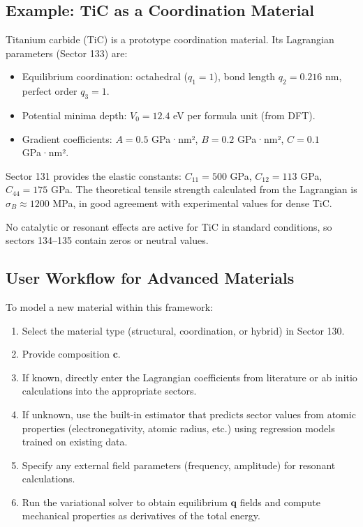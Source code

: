\documentclass[12pt,a4paper]{article}
\begin{document}
	\subsection{Example: TiC as a Coordination Material}
	\label{subsec:example-tic}
	
	Titanium carbide (TiC) is a prototype coordination material. Its Lagrangian parameters (Sector 133) are:
	
	\begin{itemize}
		\item Equilibrium coordination: octahedral (\(q_1=1\)), bond length \(q_2 = 0.216\) nm, perfect order \(q_3=1\).
		\item Potential minima depth: \(V_0 = 12.4\) eV per formula unit (from DFT).
		\item Gradient coefficients: \(A=0.5\) GPa·nm², \(B=0.2\) GPa·nm², \(C=0.1\) GPa·nm².
	\end{itemize}
	
	Sector 131 provides the elastic constants: \(C_{11}=500\) GPa, \(C_{12}=113\) GPa, \(C_{44}=175\) GPa. The theoretical tensile strength calculated from the Lagrangian is \(\sigma_B \approx 1200\) MPa, in good agreement with experimental values for dense TiC.
	
	No catalytic or resonant effects are active for TiC in standard conditions, so sectors 134–135 contain zeros or neutral values.
	
	\subsection{User Workflow for Advanced Materials}
	\label{subsec:workflow}
	
	To model a new material within this framework:
	
	\begin{enumerate}
		\item Select the material type (structural, coordination, or hybrid) in Sector 130.
		\item Provide composition \(\mathbf{c}\).
		\item If known, directly enter the Lagrangian coefficients from literature or ab initio calculations into the appropriate sectors.
		\item If unknown, use the built-in estimator that predicts sector values from atomic properties (electronegativity, atomic radius, etc.) using regression models trained on existing data.
		\item Specify any external field parameters (frequency, amplitude) for resonant calculations.
		\item Run the variational solver to obtain equilibrium \(\mathbf{q}\) fields and compute mechanical properties as derivatives of the total energy.
	\end{enumerate}
	
\end{document}
